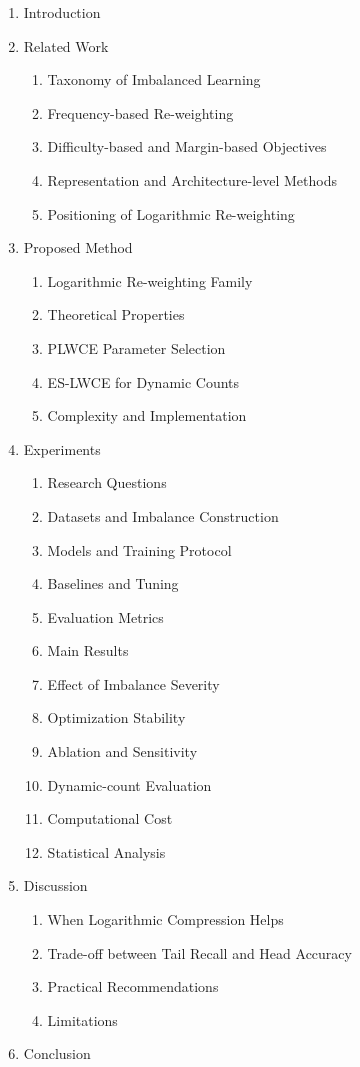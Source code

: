 \documentclass[11pt,a4paper]{article}
\begin{document}
\begin{enumerate}
\item Introduction
\item Related Work
\begin{enumerate}
\item Taxonomy of Imbalanced Learning
\item Frequency-based Re-weighting
\item Difficulty-based and Margin-based Objectives
\item Representation and Architecture-level Methods
\item Positioning of Logarithmic Re-weighting
\end{enumerate}
\item Proposed Method
\begin{enumerate}
\item Logarithmic Re-weighting Family
\item Theoretical Properties
\item PLWCE Parameter Selection
\item ES-LWCE for Dynamic Counts
\item Complexity and Implementation
\end{enumerate}
\item Experiments
\begin{enumerate}
\item Research Questions
\item Datasets and Imbalance Construction
\item Models and Training Protocol
\item Baselines and Tuning
\item Evaluation Metrics
\item Main Results
\item Effect of Imbalance Severity
\item Optimization Stability
\item Ablation and Sensitivity
\item Dynamic-count Evaluation
\item Computational Cost
\item Statistical Analysis
\end{enumerate}
\item Discussion
\begin{enumerate}
\item When Logarithmic Compression Helps
\item Trade-off between Tail Recall and Head Accuracy
\item Practical Recommendations
\item Limitations
\end{enumerate}
\item Conclusion
\end{enumerate}
\end{document}
